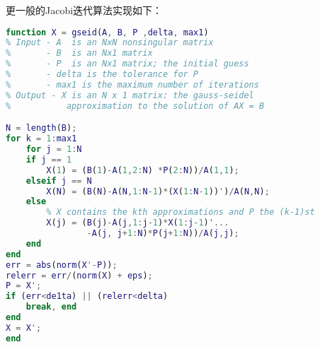 \documentclass[UTF8]{ctexart}
\begin{document}
更一般的Jacobi迭代算法实现如下：
\begin{lstlisting}[language=matlab]
function X = gseid(A, B, P ,delta, max1)
% Input - A  is an NxN nonsingular matrix 
%       - B  is an Nx1 matrix
%       - P  is an Nx1 matrix; the initial guess
%       - delta is the tolerance for P
%       - max1 is the maximum number of iterations
% Output - X is an N x 1 matrix: the gauss-seidel
%           approximation to the solution of AX = B

N = length(B);
for k = 1:max1
	for j = 1:N
	if j == 1
		X(1) = (B(1)-A(1,2:N) *P(2:N))/A(1,1);
	elseif j == N
		X(N) = (B(N)-A(N,1:N-1)*(X(1:N-1))')/A(N,N);
	else
		% X contains the kth approximations and P the (k-1)st
		X(j) = (B(j)-A(j,1:j-1)*X(1:j-1)'...
				-A(j, j+1:N)*P(j+1:N))/A(j,j);
	end
end
err = abs(norm(X'-P));
relerr = err/(norm(X) + eps);
P = X';
if (err<de1ta) || (relerr<delta)
	break, end
end
X = X';
end
\end{lstlisting}
\end{document}
